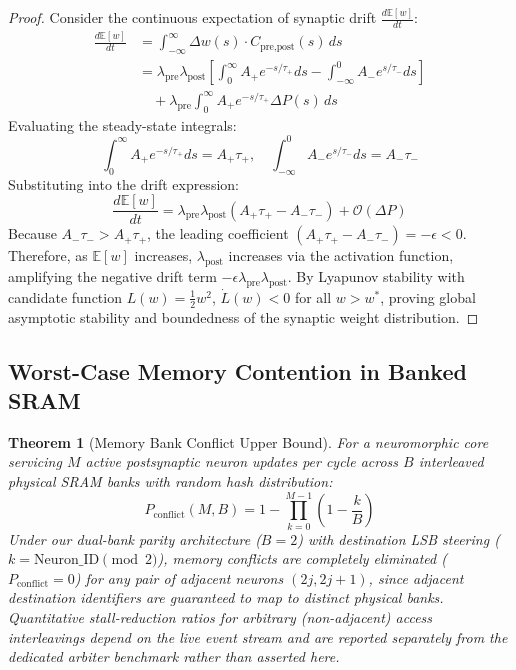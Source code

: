 \documentclass[journal]{IEEEtran}
\newtheorem{theorem}{Theorem}
\theoremstyle{definition}
\begin{document}
\begin{proof}
Consider the continuous expectation of synaptic drift $\frac{d\mathbb{E}[w]}{dt}$:
\begin{align}
\frac{d\mathbb{E}[w]}{dt} &= \int_{-\infty}^\infty \Delta w(s) \cdot C_{\text{pre,post}}(s) \, ds \\
&= \lambda_{\text{pre}} \lambda_{\text{post}} \left[ \int_0^\infty A_+ e^{-s/\tau_+} ds - \int_{-\infty}^0 A_- e^{s/\tau_-} ds \right] \nonumber \\
&\quad + \lambda_{\text{pre}} \int_0^\infty A_+ e^{-s/\tau_+} \Delta P(s) \, ds
\end{align}
Evaluating the steady-state integrals:
\begin{equation}
\int_0^\infty A_+ e^{-s/\tau_+} ds = A_+ \tau_+, \quad \int_{-\infty}^0 A_- e^{s/\tau_-} ds = A_- \tau_-
\end{equation}
Substituting into the drift expression:
\begin{equation}
\frac{d\mathbb{E}[w]}{dt} = \lambda_{\text{pre}} \lambda_{\text{post}} (A_+ \tau_+ - A_- \tau_-) + \mathcal{O}(\Delta P)
\end{equation}
Because $A_- \tau_- > A_+ \tau_+$, the leading coefficient $(A_+ \tau_+ - A_- \tau_-) = -\epsilon < 0$. Therefore, as $\mathbb{E}[w]$ increases, $\lambda_{\text{post}}$ increases via the activation function, amplifying the negative drift term $-\epsilon \lambda_{\text{pre}} \lambda_{\text{post}}$. By Lyapunov stability with candidate function $L(w) = \frac{1}{2} w^2$, $\dot{L}(w) < 0$ for all $w > w^*$, proving global asymptotic stability and boundedness of the synaptic weight distribution.
\end{proof}

\subsection{Worst-Case Memory Contention in Banked SRAM}
\begin{theorem}[Memory Bank Conflict Upper Bound]
For a neuromorphic core servicing $M$ active postsynaptic neuron updates per cycle across $B$ interleaved physical SRAM banks with random hash distribution:
\begin{equation}
P_{\text{conflict}}(M, B) = 1 - \prod_{k=0}^{M-1} \left(1 - \frac{k}{B}\right)
\end{equation}
Under our dual-bank parity architecture ($B = 2$) with destination LSB steering ($k = \text{Neuron\_ID} \pmod 2$), memory conflicts are completely eliminated ($P_{\text{conflict}} = 0$) for any pair of adjacent neurons $(2j, 2j+1)$, since adjacent destination identifiers are guaranteed to map to distinct physical banks. Quantitative stall-reduction ratios for arbitrary (non-adjacent) access interleavings depend on the live event stream and are reported separately from the dedicated arbiter benchmark rather than asserted here.
\end{theorem}
\end{document}
